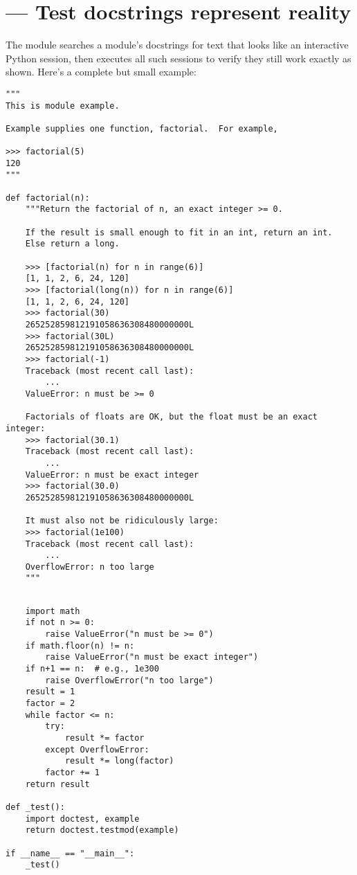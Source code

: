 \section{ ---
         Test docstrings represent reality}



The  module searches a module's docstrings for text that looks
like an interactive Python session, then executes all such sessions to verify
they still work exactly as shown.  Here's a complete but small example:

\begin{verbatim}
"""
This is module example.

Example supplies one function, factorial.  For example,

>>> factorial(5)
120
"""

def factorial(n):
    """Return the factorial of n, an exact integer >= 0.

    If the result is small enough to fit in an int, return an int.
    Else return a long.

    >>> [factorial(n) for n in range(6)]
    [1, 1, 2, 6, 24, 120]
    >>> [factorial(long(n)) for n in range(6)]
    [1, 1, 2, 6, 24, 120]
    >>> factorial(30)
    265252859812191058636308480000000L
    >>> factorial(30L)
    265252859812191058636308480000000L
    >>> factorial(-1)
    Traceback (most recent call last):
        ...
    ValueError: n must be >= 0

    Factorials of floats are OK, but the float must be an exact integer:
    >>> factorial(30.1)
    Traceback (most recent call last):
        ...
    ValueError: n must be exact integer
    >>> factorial(30.0)
    265252859812191058636308480000000L

    It must also not be ridiculously large:
    >>> factorial(1e100)
    Traceback (most recent call last):
        ...
    OverflowError: n too large
    """

\end{verbatim}
\begin{verbatim}

    import math
    if not n >= 0:
        raise ValueError("n must be >= 0")
    if math.floor(n) != n:
        raise ValueError("n must be exact integer")
    if n+1 == n:  # e.g., 1e300
        raise OverflowError("n too large")
    result = 1
    factor = 2
    while factor <= n:
        try:
            result *= factor
        except OverflowError:
            result *= long(factor)
        factor += 1
    return result

def _test():
    import doctest, example
    return doctest.testmod(example)

if __name__ == "__main__":
    _test()
\end{verbatim}

